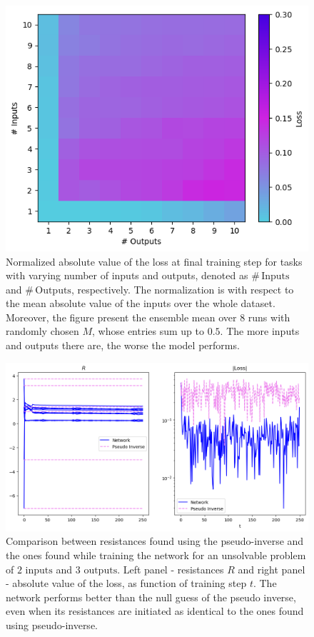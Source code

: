 \documentclass[%
 reprint,
 amsmath,amssymb,
 aps,
]{revtex4-2}
\begin{document}
    \begin{figure}[ht]
    \centerline{
    \includegraphics[width=\columnwidth]{Figures/loss_afo_in_out.png}
    }
    \caption{Normalized absolute value of the loss at final training step for tasks with varying number of inputs and outputs, denoted as $\# \, \text{Inputs}$ and $\# \, \text{Outputs}$, respectively. The normalization is with respect to the mean absolute value of the inputs over the whole dataset. Moreover, the figure present the ensemble mean over $8$ runs with randomly chosen $M$, whose entries sum up to $0.5$. The more inputs and outputs there are, the worse the model performs.}
    \label{fig:log_loss_afo_inputs_outputs}
    \end{figure}

    \begin{figure}[ht]
    \centerline{
    \includegraphics[width=\columnwidth]{Figures/pseudo_vs_network_comparison.png}
    }
    \caption{Comparison between resistances found using the pseudo-inverse and the ones found while training the network for an unsolvable problem of $2\text{ inputs}$ and $3\text{ outputs}$. Left panel - resistances $R$ and right panel - absolute value of the loss, as function of training step $t$. The network performs better than the null guess of the pseudo inverse, even when its resistances are initiated as identical to the ones found using pseudo-inverse.}
    \label{fig:pseudo_vs_network_comparison}
    \end{figure}
\end{document}
